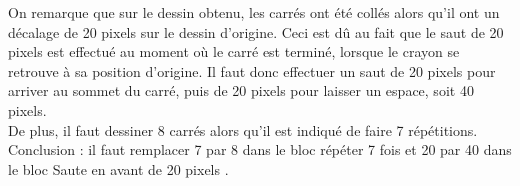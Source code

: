    On remarque que sur le dessin obtenu, les carrés ont été collés alors qu'il ont un décalage de 20 pixels sur le dessin d'origine. Ceci est dû au fait que le saut de 20 pixels est effectué au moment où le carré est terminé, lorsque le crayon se retrouve à sa position d'origine. Il faut donc effectuer un saut de 20 pixels pour arriver au sommet du carré, puis de 20 pixels pour laisser un espace, soit 40 pixels. \\
   De plus, il faut dessiner 8 carrés alors qu'il est indiqué de faire 7 répétitions. \\
   Conclusion : {\blue il faut remplacer 7 par 8 dans le bloc \og répéter 7 fois \fg{} et 20 par 40 dans le bloc \og Saute en avant de 20 pixels \fg}. \\
